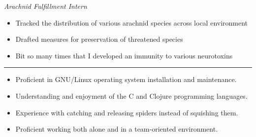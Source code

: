 \documentclass[a4paper, 12pt]{article}
\begin{document}
\begin{flushleft}
\newline
\textit{Arachnid Fulfillment Intern}
\begin{itemize}
\item Tracked the distribution of various arachnid species across local environment
\item Drafted measures for preservation of threatened species
\item Bit so many times that I developed an immunity to various neurotoxins
\end{itemize}
\end{flushleft}
\begin{flushleft}
\noindent\rule{\textwidth}{0.4pt}
\end{flushleft}
\begin{flushleft}
\begin{multicols}{2}
\begin{itemize}
\item Proficient in GNU/Linux operating system installation and maintenance.
\item Understanding and enjoyment of the C and Clojure programming languages.
\item Experience with catching and releasing spiders instead of squishing them.
\item Proficient working both alone and in a team-oriented environment.
\end{itemize}
\end{multicols}
\end{flushleft}
\end{document}

